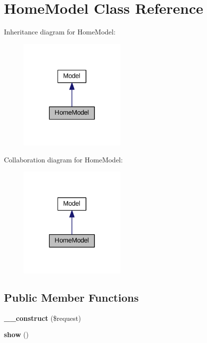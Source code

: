 \hypertarget{classHomeModel}{\section{Home\+Model Class Reference}
\label{classHomeModel}
}


Inheritance diagram for Home\+Model\+:\nopagebreak
\begin{figure}[H]
\begin{center}
\leavevmode
\includegraphics[width=148pt]{classHomeModel__inherit__graph}
\end{center}
\end{figure}


Collaboration diagram for Home\+Model\+:\nopagebreak
\begin{figure}[H]
\begin{center}
\leavevmode
\includegraphics[width=148pt]{classHomeModel__coll__graph}
\end{center}
\end{figure}
\subsection*{Public Member Functions}
\begin{DoxyCompactItemize}
\item 
\hypertarget{classHomeModel_a827ab168cf18de7ce28e76fa233106c6}{{\bfseries \+\_\+\+\_\+construct} (\$request)}\label{classHomeModel_a827ab168cf18de7ce28e76fa233106c6}

\item 
\hypertarget{classHomeModel_a2b17e9cf47625d6068ad2692a94771ce}{{\bfseries show} ()}\label{classHomeModel_a2b17e9cf47625d6068ad2692a94771ce}

\end{DoxyCompactItemize}
